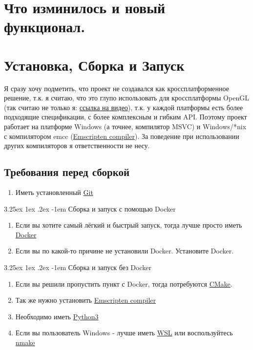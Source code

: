 \documentclass[12pt]{article}
\makeatletter
\renewcommand\paragraph{\@startsection{paragraph}{5}{\z@}%
  {3.25ex \@plus1ex \@minus.2ex}%
  {-1em}%
  {\normalfont\normalsize\bfseries}}
\makeatother
\begin{document}
    \section{Что изминилось и новый функционал.}
    \label{sec:fickle}
    \newpage
    \section{Установка, Сборка и Запуск}
    Я сразу хочу подметить, что проект не создавался как кроссплатформенное
    решение, т.к. я считаю, что это глупо использовать для кроссплатформы
    OpenGL (так считаю не только я: \href{https://www.youtube.com/watch?v=W3gAzLwfIP0}{ссылка на видео}), т.к. у каждой платформы есть более подходящие спецификации, с 
    более комплексным и гибким API. Поэтому проект работает на
    платформе Windows (а точнее, компилятор MSVC) и Windows/*nix 
    с компилятором emcc (\href{https://emscripten.org/}{Emscripten compiler}).
    За поведение при использовании других компиляторов я ответственности не 
    несу.
    \subsection{Требования перед сборкой}
    \label{sec:pre_req}
    \begin{enumerate}
      \item Иметь установленный \href{https://git-scm.com/}{Git}
    \end{enumerate}
    \paragraph{Сборка и запуск с помощью Docker}
    \begin{enumerate}
        \item Если вы хотите самый лёгкий и быстрый запуск, тогда лучше
        просто иметь \href{https://www.docker.com/}{Docker}
        \item Если вы по какой-то причине не установили Docker. Установите
        Docker.
    \end{enumerate}
    \paragraph{Сборка и запуск без Docker}
    \begin{enumerate}
        \item Если вы решили пропустить пункт с Docker, тогда потребуются
        \href{https://cmake.org/}{CMake}.
        \item Так же нужно установить \href{https://emscripten.org/}{Emscripten compiler}
        \item Необходимо иметь \href{https://www.python.org/}{Python3} 
        \item Если вы пользователь Windows - лучше иметь 
        \href{https://docs.microsoft.com/ru-ru/windows/wsl/install-win10}{WSL}
        или воспользуйтесь \href{https://docs.microsoft.com/ru-ru/cpp/build/reference/nmake-reference?view=vs-2019}{nmake}
    \end{enumerate}
\end{document}

